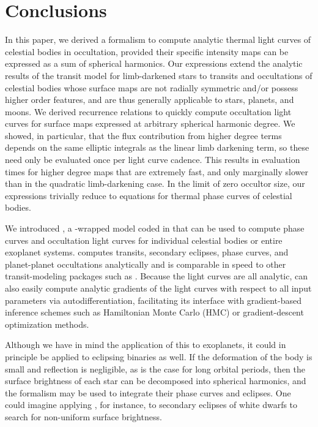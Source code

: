 \documentclass[modern]{aastex61}
\begin{document}
\section{Conclusions}
\label{sec:conclusions}

In this paper, we derived a formalism to compute analytic thermal light curves of celestial
bodies in occultation, provided their specific intensity maps can be expressed as a sum
of spherical harmonics. Our expressions extend the analytic results of the
\citet{MandelAgol2002} transit model for limb-darkened stars to transits and
occultations of celestial bodies whose surface maps are not radially symmetric
and/or possess higher order features, and are thus generally applicable to
stars, planets, and moons. We derived recurrence relations to quickly compute
occultation light curves for surface maps expressed at arbitrary spherical harmonic degree.
We showed, in particular, that the flux contribution from higher degree terms
depends on the same elliptic integrals as the linear limb darkening term,
so these need only be evaluated once per light curve cadence. This results in
evaluation times for higher degree maps that are extremely fast, and
only marginally slower than in the quadratic limb-darkening case.
In the limit of zero occultor size, our expressions trivially reduce to equations
for thermal phase curves of celestial bodies.

We introduced \starry, a \Python-wrapped model coded in \cpp
that can be used to compute phase curves and occultation light curves for
individual celestial bodies or entire exoplanet systems. \starry computes
transits, secondary eclipses, phase curves, and planet-planet occultations
analytically and is comparable in speed to other transit-modeling packages such
as \batman \citep{Kreidberg2015}. Because the light curves are all analytic,
\starry can also easily compute analytic gradients of the light curves with respect
to all input parameters via autodifferentiation, facilitating its interface with
gradient-based inference schemes such as Hamiltonian Monte Carlo (HMC)
or gradient-descent optimization methods.

Although we have in mind the application of this \starry to exoplanets, it could
in principle be applied to eclipsing binaries as well.  If the deformation of
the body is small and reflection is negligible, as is the case for long orbital periods,
then the surface brightness of each star can be decomposed into spherical harmonics,
and the \starry formalism may be used to integrate their phase curves and eclipses.
One could imagine applying \starry, for instance, to secondary eclipses of white
dwarfs to search for non-uniform surface brightness.
\end{document}
